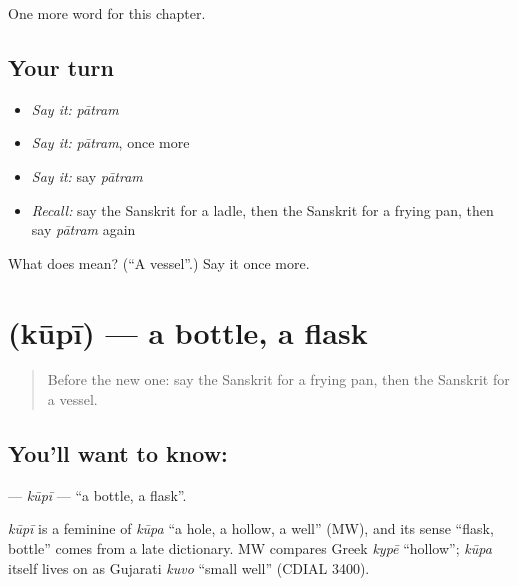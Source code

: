 \begin{grammarlens}[title={What you've built}]
One more word for this chapter.
\end{grammarlens}

\subsection*{Your turn}
\begin{itemize}
\raggedright
  \item \emph{Say it:} \emph{pātram}
  \item \emph{Say it:} \emph{pātram}, once more
  \item \emph{Say it:} say \emph{pātram}
  \item \emph{Recall:} say the Sanskrit for a ladle, then the Sanskrit for a frying pan, then say \emph{pātram} again
\end{itemize}

\begin{tcolorbox}[breakable,colback=teal!4,colframe=teal!35!black,title={Before you move on}]
What does  mean? (\textquotedblleft{}A vessel\textquotedblright{}.) Say it once more.
\end{tcolorbox}
\section[\texorpdfstring{\sk{कूपी} (kūpī)}{कूपी (kūpī)}]{ (kūpī) — a bottle, a flask}

\label{lesson:SA-C119-kupi}



\begin{quote}
Before the new one: say the Sanskrit for a frying pan, then the Sanskrit for a vessel.
\end{quote}

\subsection*{You'll want to know: }
\textbf{} — \emph{kūpī} — \textquotedblleft{}a bottle, a flask\textquotedblright{}.

\begin{cousinweb}
\emph{kūpī} is a feminine of \emph{kūpa} \textquotedblleft{}a hole, a hollow, a well\textquotedblright{} (MW), and its sense \textquotedblleft{}flask, bottle\textquotedblright{} comes from a late dictionary. MW compares Greek \emph{kypē} \textquotedblleft{}hollow\textquotedblright{}; \emph{kūpa} itself lives on as Gujarati \emph{kuvo} \textquotedblleft{}small well\textquotedblright{} (CDIAL 3400).
\end{cousinweb}


